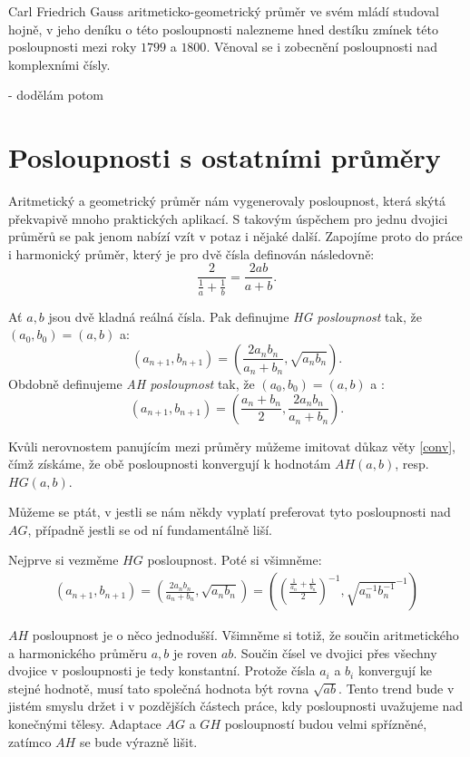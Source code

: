 \documentclass[12pt]{report}
\begin{document}
Carl Friedrich Gauss aritmeticko-geometrický průměr ve svém mládí studoval hojně, v jeho deníku o této posloupnosti nalezneme hned destíku zmínek této posloupnosti mezi roky $1799$ a $1800$. Věnoval se i zobecnění posloupnosti nad komplexními čísly.

- dodělám potom 


\section{Posloupnosti s ostatními průměry}

Aritmetický a geometrický průměr nám vygenerovaly posloupnost, která skýtá překvapivě mnoho praktických aplikací. S takovým úspěchem pro jednu dvojici průměrů se pak jenom nabízí vzít v potaz i nějaké další. Zapojíme proto do práce i harmonický průměr, který je pro dvě čísla definován následovně:
$$\frac{2}{\frac{1}{a}+\frac{1}{b}} = \frac{2ab}{a+b}.$$

\begin{definice}
Ať $a,b$ jsou dvě kladná reálná čísla. Pak definujme \textit{HG posloupnost} tak, že $(a_0,b_0) = (a,b)$ a:
$$\left(a_{n+1},b_{n+1} \right) = \left( \frac{2 a_n b_n}{a_n+b_n} , \sqrt{a_n b_n} \right).$$
Obdobně definujeme \textit{AH posloupnost} tak, že $(a_0,b_0) = (a,b)$ a :
$$\left(a_{n+1},b_{n+1} \right) = \left( \frac{a_n+b_n}{2}, \frac{2 a_n b_n}{a_n+b_n} \right).$$
\end{definice}
Kvůli nerovnostem panujícím mezi průměry můžeme imitovat důkaz věty \ref{conv}, čímž získáme, že obě posloupnosti konvergují k hodnotám $AH(a,b)$, resp. $HG(a,b)$.

Můžeme se ptát, v jestli se nám někdy vyplatí preferovat tyto posloupnosti nad $AG$, případně jestli se od ní fundamentálně liší. 

Nejprve si vezměme $HG$ posloupnost. Poté si všimněme:
\begin{align*}
\left(a_{n+1}, b_{n+1} \right) = \left( \frac{2 a_n b_n}{a_n + b_n}, \sqrt{a_n b_n} \right) = \left( \left(\frac{\frac{1}{a_n}+ \frac{1}{b_n}}{2} \right)^{-1}, \sqrt{a_n ^{-1} b_n ^{-1}} ^{-1}  \right)
\end{align*}

$AH$ posloupnost je o něco jednodušší. Všimněme si totiž, že součin aritmetického a harmonického průměru $a,b$ je roven $ab$. Součin čísel ve dvojici přes všechny dvojice v posloupnosti je tedy konstantní. Protože čísla $a_i$ a $b_i$ konvergují ke stejné hodnotě, musí tato společná hodnota být rovna $\sqrt{ab}$. Tento trend bude v jistém smyslu držet i v pozdějších částech práce, kdy posloupnosti uvažujeme nad konečnými tělesy. Adaptace $AG$ a $GH$ posloupností budou velmi spřízněné, zatímco $AH$ se bude výrazně lišit.
\end{document}
